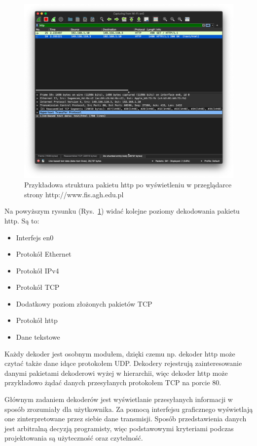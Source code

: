 \documentclass[a4paper, 12pt, twoside, openright]{article}
\begin{document}
	\begin{figure}[h]
		\centering
			\includegraphics[width=1.0\textwidth]{img/screenshot_fis.png}
		\caption{Przykładowa struktura pakietu http po wyświetleniu w przeglądarce strony http://www.fis.agh.edu.pl}
		\label{fig:fis}
	\end{figure}

	Na powyższym rysunku (Rys.~\ref{fig:fis}) widać kolejne poziomy dekodowania pakietu http. Są to:
	\begin{itemize}
		\item Interfejs en0
		\item Protokół Ethernet
		\item Protokół IPv4
		\item Protokół TCP
		\item Dodatkowy poziom złożonych pakietów TCP
		\item Protokół http
		\item Dane tekstowe
	\end{itemize}

	Każdy dekoder jest osobnym modułem, dzięki czemu np. dekoder http może czytać także dane idące protokołem UDP.
	Dekodery rejestrują zainteresowanie danymi pakietami dekoderowi wyżej w hierarchii, więc dekoder http może przykładowo
	żądać danych przesyłanych protokołem TCP na porcie 80.

	Głównym zadaniem dekoderów jest wyświetlanie przesyłanych informacji w sposób zrozumiały dla użytkownika. Za pomocą
	interfejsu graficznego wyświetlają one zinterpretowane przez siebie dane transmisji. Sposób przedstawienia danych
	jest arbitralną decyzją programisty, więc podstawowymi kryteriami podczas projektowania są użyteczność oraz czytelność.
\end{document}
